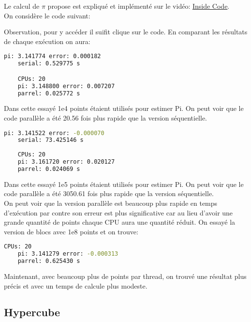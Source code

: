 \documentclass{article}
\begin{document}
\begin{resolution}
    Le calcul de $\pi$ propose est expliqué et implémenté sur le vidéo: \href{https://www.youtube.com/watch?v=prPyPvjvfqM}{Inside Code}.\\

    On considère le code suivant:
    \begin{scriptsize}
        \mycode
    \end{scriptsize}
    Observation, pour y accéder il suifit clique sur le code. En comparant les résultats de chaque exécution on aura:
    \begin{scriptsize}
        \mycode
        \begin{lstlisting}[language=bash]
    pi: 3.141774 error: 0.000182
    serial: 0.529775 s

    CPUs: 20
    pi: 3.148800 error: 0.007207
    parrel: 0.025772 s
        \end{lstlisting}
    \end{scriptsize}
    Dans cette essayé 1e4 points étaient utilisés pour estimer Pi. On peut voir que le code parallèle a été 20.56 fois plus rapide que la version séquentielle.\\

    \begin{scriptsize}
        \mycode
        \begin{lstlisting}[language=bash]
    pi: 3.141522 error: -0.000070
    serial: 73.425146 s
    
    CPUs: 20
    pi: 3.161720 error: 0.020127
    parrel: 0.024069 s
        \end{lstlisting}
    \end{scriptsize}
    Dans cette essayé 1e5 points étaient utilisés pour estimer Pi. On peut voir que le code parallèle a été 3050.61 fois plus rapide que la version séquentielle.\\

    On peut voir que la version parallèle est beaucoup plus rapide en temps d'exécution par contre son erreur est plus significative car au lieu d'avoir une grande quantité de points chaque CPU aura une quantité réduit. On essayé la version de blocs avec 1e8 points et on trouve:
    \begin{scriptsize}
        \mycode
        \begin{lstlisting}[language=bash]
    CPUs: 20
    pi: 3.141279 error: -0.000313
    parrel: 0.625430 s
        \end{lstlisting}
    \end{scriptsize}
    Maintenant, avec beaucoup plus de points par thread, on trouvé une résultat plus précis et avec un temps de calcule plus modeste.
\end{resolution}



\newpage\subsection{Hypercube}
\begin{resolution}
    
\end{resolution}
\end{document}
